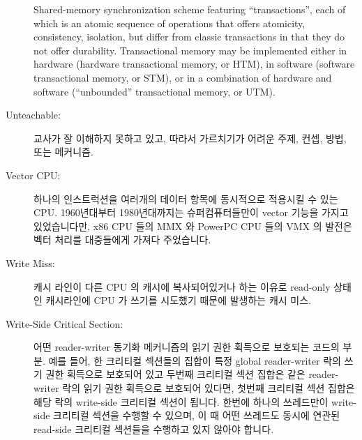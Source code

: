 \begin{description}
	Shared-memory synchronization scheme featuring ``transactions'',
	each of which is an atomic sequence of operations
	that offers atomicity, consistency, isolation, but differ from
	classic transactions in that they do not offer
	durability.
	Transactional memory may be implemented either in hardware
	(hardware transactional memory, or HTM), in software (software
	transactional memory, or STM), or in a combination of hardware
	and software (``unbounded'' transactional memory, or UTM).
	\fi
\item[Unteachable:]
	교사가 잘 이해하지 못하고 있고, 따라서 가르치기가 어려운 주제, 컨셉,
	방법, 또는 메커니즘.
	\iffalse

	A topic, concept, method, or mechanism that the teacher does
	not understand well is therefore uncomfortable teaching.
	\fi
\item[Vector CPU:]
	하나의 인스트럭션을 여러개의 데이터 항목에 동시적으로 적용시킬 수 있는
	CPU.
	1960년대부터 1980년대까지는 슈퍼컴퓨터들만이 vector 기능을 가지고
	있었습니다만, x86 CPU 들의 MMX 와 PowerPC CPU 들의 VMX 의 발전은 벡터
	처리를 대중들에게 가져다 주었습니다.
	\iffalse

	A CPU that can apply a single instruction to multiple items of
	data concurrently.
	In the 1960s through the 1980s, only supercomputers had vector
	capabilities, but the advent of MMX in x86 CPUs and VMX in
	PowerPC CPUs brought vector processing to the masses.
	\fi
\item[Write Miss:]
	캐시 라인이 다른 CPU 의 캐시에 복사되어있거나 하는 이유로 read-only
	상태인 캐시라인에 CPU 가 쓰기를 시도했기 때문에 발생하는 캐시 미스.
	\iffalse

	A cache miss incurred because the corresponding CPU attempted
	to write to a cache line that is read-only, most likely due
	to its being replicated in other CPUs' caches.
	\fi
\item[Write-Side Critical Section:]
	어떤 reader-writer 동기화 메커니즘의 읽기 권한 획득으로 보호되는 코드의
	부분.
	예를 들어, 한 크리티컬 섹션들의 집합이 특정 global reader-writer 락의
	쓰기 권한 획득으로 보호되어 있고 두번째 크리티컬 섹션 집합은 같은
	reader-writer 락의 읽기 권한 획득으로 보호되어 있다면, 첫번째 크리티컬
	섹션 집합은 해당 락의 write-side 크리티컬 섹션이 됩니다.
	한번에 하나의 쓰레드만이 write-side 크리티컬 섹션을 수행할 수 있으며,
	이 때 어떤 쓰레드도 동시에 연관된 read-side 크리티컬 섹션들을 수행하고
	있지 않아야 합니다.
	\iffalse

	A section of code guarded by write-acquisition of
	some reader-writer synchronization mechanism.
	For example, if one set of critical sections are guarded by
	write-acquisition of
	a given global reader-writer lock, while a second set of critical
	section are guarded by read-acquisition of that same reader-writer
	lock, then the first set of critical sections will be the
	write-side critical sections for that lock.
	Only one thread may execute in the write-side critical section
	at a time, and even then only if there are no threads are
	executing concurrently in any of the corresponding read-side
	critical sections.
	\fi
\end{description}
